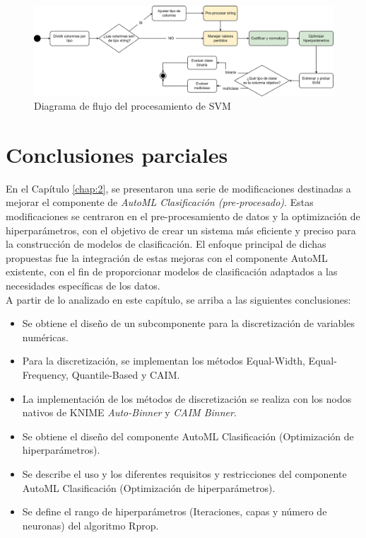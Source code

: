 \begin{figure}[H]
	\centering
	\includegraphics[width=1\linewidth]{"figuras/capi 2/modelos/procesado svm.drawio"}
	\caption{Diagrama de flujo del procesamiento de SVM}
	\label{fig:procesado-svm}
\end{figure}


\section{Conclusiones parciales}
En el Capítulo \ref{chap:2}, se presentaron una serie de modificaciones destinadas a mejorar el componente de \emph{AutoML Clasificación (pre-procesado)}. Estas modificaciones se centraron en el pre-procesamiento de datos y la optimización de hiperparámetros, con el objetivo de crear un sistema más eficiente y preciso para la construcción de modelos de clasificación. El enfoque principal de dichas propuestas fue la integración de estas mejoras con el componente AutoML existente, con el fin de proporcionar modelos de clasificación adaptados a las necesidades específicas de los datos.\\
A partir de lo analizado en este capítulo, se arriba a las siguientes conclusiones:
\begin{itemize}
	\item Se obtiene el diseño de un subcomponente para la discretización de variables numéricas.
	\item Para la discretización, se implementan los métodos Equal-Width, Equal-Frequency, Quantile-Based y CAIM.
	\item La implementación de los métodos de discretización se realiza con los nodos nativos de KNIME \textit{Auto-Binner} y \textit{CAIM Binner}.
	\item Se obtiene el diseño del componente AutoML Clasificación (Optimización de hiperparámetros).
	\item Se describe el uso y  los diferentes requisitos y restricciones del componente AutoML Clasificación (Optimización de hiperparámetros).
	\item Se define el rango de hiperparámetros (Iteraciones, capas y número de neuronas) del algoritmo Rprop.
\end{itemize}

\pagebreak

